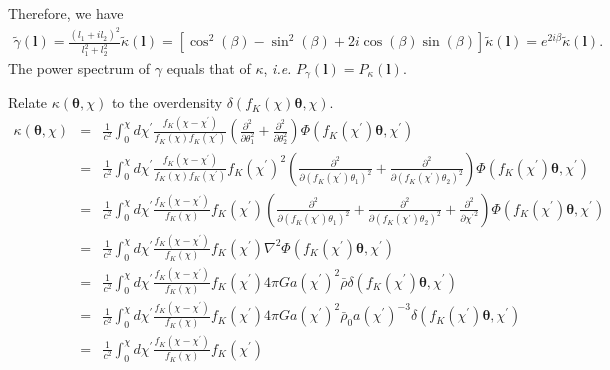 \documentclass[twocolumn]{aastex62}
\def\ie{{\it i.e. }}
\begin{document}
Therefore, we have
\begin{eqnarray}
\tilde{\gamma}(\boldsymbol{l}) = \frac{(l_1 +il_2 )^2}{l_1^2 + l_2^2}\tilde{\kappa}(\boldsymbol{l}) = [\cos^2(\beta) - \sin^2(\beta) + 2i \cos(\beta) \sin(\beta)]\tilde{\kappa}(\boldsymbol{l}) = e^{2i\beta}\tilde{\kappa}(\boldsymbol{l}).
\end{eqnarray}
The power spectrum of $\gamma$ equals that of $\kappa$, \ie $P_{\gamma}(\boldsymbol{l}) = P_{\kappa}(\boldsymbol{l})$.

Relate $\kappa(\boldsymbol{\theta},\chi)$ to the overdensity $\delta(f_K(\chi)\boldsymbol{\theta},\chi)$.
\begin{eqnarray}
\kappa(\boldsymbol{\theta},\chi) &=& \frac{1}{c^2}\int_0^{\chi} d\chi^{\prime} \frac{f_K(\chi - \chi^{\prime})}{f_K(\chi)f_K(\chi^{\prime})}(\frac{\partial^2}{\partial \theta_1^2} + \frac{\partial^2}{\partial \theta_2^2})\Phi(f_K(\chi^{\prime})\boldsymbol{\theta}, \chi^{\prime})\\ \nonumber
&=& \frac{1}{c^2}\int_0^{\chi} d\chi^{\prime} \frac{f_K(\chi - \chi^{\prime})}{f_K(\chi)f_K(\chi^{\prime})}
f_K(\chi^{\prime})^2 (\frac{\partial^2}{\partial (f_K(\chi^{\prime})\theta_1)^2} + 
\frac{\partial^2}{\partial (f_K(\chi^{\prime})\theta_2)^2})\Phi(f_K(\chi^{\prime})\boldsymbol{\theta}, \chi^{\prime})\\ \nonumber
&=& \frac{1}{c^2}\int_0^{\chi} d\chi^{\prime} \frac{f_K(\chi - \chi^{\prime})}{f_K(\chi)}f_K(\chi^{\prime})
(\frac{\partial^2}{\partial (f_K(\chi^{\prime})\theta_1)^2} + 
\frac{\partial^2}{\partial (f_K(\chi^{\prime})\theta_2)^2} + \frac{\partial^2}{\partial {\chi^{\prime}}^2})\Phi(f_K(\chi^{\prime})\boldsymbol{\theta}, \chi^{\prime})\\ \nonumber
&=& \frac{1}{c^2}\int_0^{\chi} d\chi^{\prime} \frac{f_K(\chi - \chi^{\prime})}{f_K(\chi)}f_K(\chi^{\prime})
\nabla^2\Phi(f_K(\chi^{\prime})\boldsymbol{\theta}, \chi^{\prime})\\ \nonumber
&=& \frac{1}{c^2}\int_0^{\chi} d\chi^{\prime} \frac{f_K(\chi - \chi^{\prime})}{f_K(\chi)}f_K(\chi^{\prime})
4\pi G a(\chi^{\prime})^2 \bar{\rho} \delta(f_K(\chi^{\prime})\boldsymbol{\theta},\chi^{\prime})\\ \nonumber
&=& \frac{1}{c^2}\int_0^{\chi} d\chi^{\prime} \frac{f_K(\chi - \chi^{\prime})}{f_K(\chi)}f_K(\chi^{\prime})
4\pi G a(\chi^{\prime})^2 \bar{\rho}_0a(\chi^{\prime})^{-3} \delta(f_K(\chi^{\prime})\boldsymbol{\theta},\chi^{\prime})\\ \nonumber
&=& \frac{1}{c^2}\int_0^{\chi} d\chi^{\prime} \frac{f_K(\chi - \chi^{\prime})}{f_K(\chi)}f_K(\chi^{\prime})

\end{eqnarray}
\end{document}
